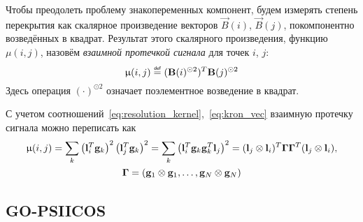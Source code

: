 Чтобы преодолеть проблему знакопеременных компонент, будем измерять степень перекрытия как скалярное произведение векторов $\vec{B}(i)$, $\vec{B}(j)$, покомпонентно возведённых в квадрат. Результат
этого скалярного произведения, функцию $\mu(i, j)$, назовём \emph{взаимной протечкой сигнала} для точек $i$, $j$:
\begin{equation}
    \mu(i, j) \defeq (\vec{B}(i)^{\odot 2})^T \vec{B}(j)^{\odot 2}
    \label{eq:def_mutual_leakage}
\end{equation}
Здесь операция $(\cdot)^{\odot 2}$ означает поэлементное возведение в квадрат.

С учетом соотношений~\ref{eq:resolution_kernel},~\ref{eq:kron_vec} взаимную протечку сигнала можно переписать как
\begin{multline}
    \upmu(i, j)= \sum_k \left(\mathbf{l}_i^T \mathbf{g}_k\right)^2\left(\mathbf{l}_j^T \mathbf{g}_k\right)^2=
    \sum_k\left(\mathbf{l}_i^T \mathbf{g}_k\mathbf{g}_k^T \mathbf{l}_j\right)^2=(\mathbf{l}_j \otimes \mathbf{l}_i)^T \mathbf{\Gamma} \mathbf{\Gamma}^T(\mathbf{l}_j \otimes \mathbf{l}_i),\\
    \mathbf{\Gamma} = (\mathbf{g}_1 \otimes \mathbf{g}_1, \ldots, \mathbf{g}_N \otimes \mathbf{g}_N)
\end{multline}







\subsection{GO-PSIICOS}
